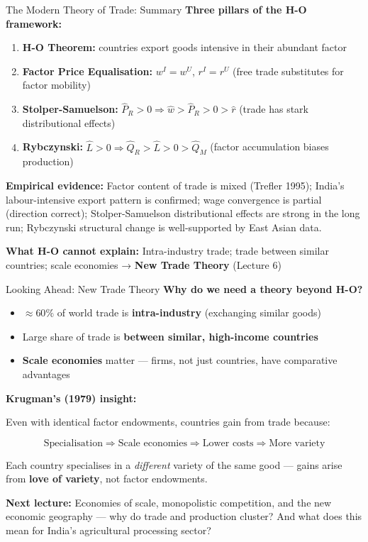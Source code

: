 \documentclass[
  ignorenonframetext,
  aspectratio=169,
]{beamer}
\makeatletter
\providecommand{\tightlist}{%
  \setlength{\itemsep}{0pt}\setlength{\parskip}{0pt}}
\let\quarto@originallabel\label
\DeclareRobustCommand*{\label}[1]{\quarto@originallabel{#1}}
\makeatother
\begin{document}
\begin{frame}{The Modern Theory of Trade: Summary}
\label{the-modern-theory-of-trade-summary}
\textbf{Three pillars of the H-O framework:}

\begin{enumerate}
\tightlist
\item
  \textbf{H-O Theorem:} countries export goods intensive in their
  abundant factor
\item
  \textbf{Factor Price Equalisation:} \(w^I = w^U\), \(r^I = r^U\) (free
  trade substitutes for factor mobility)
\item
  \textbf{Stolper-Samuelson:}
  \(\hat{P}_R > 0 \Rightarrow \hat{w} > \hat{P}_R > 0 > \hat{r}\) (trade
  has stark distributional effects)
\item
  \textbf{Rybczynski:}
  \(\hat{L} > 0 \Rightarrow \hat{Q}_R > \hat{L} > 0 > \hat{Q}_M\)
  (factor accumulation biases production)
\end{enumerate}

\textbf{Empirical evidence:} Factor content of trade is mixed (Trefler
1995); India's labour-intensive export pattern is confirmed; wage
convergence is partial (direction correct); Stolper-Samuelson
distributional effects are strong in the long run; Rybczynski structural
change is well-supported by East Asian data.

\textbf{What H-O cannot explain:} Intra-industry trade; trade between
similar countries; scale economies → \textbf{New Trade Theory} (Lecture
6)
\end{frame}

\begin{frame}{Looking Ahead: New Trade Theory}
\label{looking-ahead-new-trade-theory}
\textbf{Why do we need a theory beyond H-O?}

\begin{itemize}
\tightlist
\item
  \(\approx 60\%\) of world trade is \textbf{intra-industry} (exchanging
  similar goods)
\item
  Large share of trade is \textbf{between similar, high-income
  countries}
\item
  \textbf{Scale economies} matter --- firms, not just countries, have
  comparative advantages
\end{itemize}

\textbf{Krugman's (1979) insight:}

Even with identical factor endowments, countries gain from trade
because:

\[\text{Specialisation} \Rightarrow \text{Scale economies} \Rightarrow \text{Lower costs} \Rightarrow \text{More variety}\]

Each country specialises in a \emph{different} variety of the same good
--- gains arise from \textbf{love of variety}, not factor endowments.

\textbf{Next lecture:} Economies of scale, monopolistic competition, and
the new economic geography --- why do trade and production cluster? And
what does this mean for India's agricultural processing sector?
\end{frame}
\end{document}
